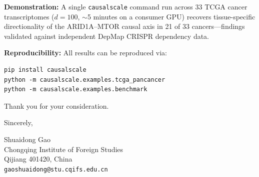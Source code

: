 \documentclass[11pt]{article}
\begin{document}
\vspace{0.5em}

\noindent \textbf{Demonstration:} A single \texttt{causalscale} command run across 33 TCGA cancer
transcriptomes ($d=100$, $\sim$5 minutes on a consumer GPU) recovers tissue-specific directionality
of the ARID1A--MTOR causal axis in 21 of 33 cancers---findings validated against independent DepMap
CRISPR dependency data.

\vspace{0.5em}

\noindent \textbf{Reproducibility:} All results can be reproduced via:
\begin{verbatim}
pip install causalscale
python -m causalscale.examples.tcga_pancancer
python -m causalscale.examples.benchmark
\end{verbatim}

\vspace{1em}

\noindent Thank you for your consideration.

\vspace{1em}

\noindent Sincerely,

\vspace{1em}

\noindent Shuaidong Gao\\
Chongqing Institute of Foreign Studies\\
Qijiang 401420, China\\
\texttt{gaoshuaidong@stu.cqifs.edu.cn}
\end{document}
